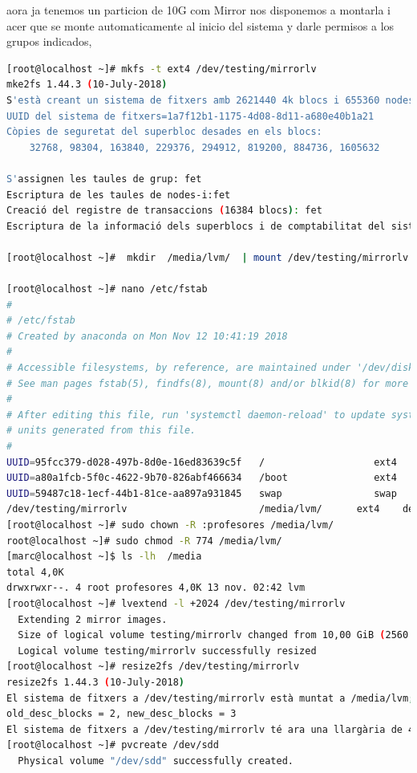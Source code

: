 \documentclass[preprint,11pt]{elsarticle}
\begin{document}
aora ja tenemos un particion de 10G com Mirror nos disponemos a montarla i acer que se monte automaticamente al inicio del sistema y darle permisos a los grupos indicados, 

\clearpage
\begin{lstlisting}[basicstyle=\tiny, language=bash]
[root@localhost ~]# mkfs -t ext4 /dev/testing/mirrorlv 
mke2fs 1.44.3 (10-July-2018)
S'està creant un sistema de fitxers amb 2621440 4k blocs i 655360 nodes-i
UUID del sistema de fitxers=1a7f12b1-1175-4d08-8d11-a680e40b1a21
Còpies de seguretat del superbloc desades en els blocs: 
	32768, 98304, 163840, 229376, 294912, 819200, 884736, 1605632

S'assignen les taules de grup: fet                            
Escriptura de les taules de nodes-i:fet                            
Creació del registre de transaccions (16384 blocs): fet
Escriptura de la informació dels superblocs i de comptabilitat del sistema de fitxers:fet  

[root@localhost ~]#  mkdir  /media/lvm/  | mount /dev/testing/mirrorlv  /media/lvm/ 

[root@localhost ~]# nano /etc/fstab 
#
# /etc/fstab
# Created by anaconda on Mon Nov 12 10:41:19 2018
#
# Accessible filesystems, by reference, are maintained under '/dev/disk/'.
# See man pages fstab(5), findfs(8), mount(8) and/or blkid(8) for more info.
#
# After editing this file, run 'systemctl daemon-reload' to update systemd
# units generated from this file.
#
UUID=95fcc379-d028-497b-8d0e-16ed83639c5f   /                   ext4    defaults        1 1
UUID=a80a1fcb-5f0c-4622-9b70-826abf466634   /boot               ext4    defaults        1 2
UUID=59487c18-1ecf-44b1-81ce-aa897a931845   swap                swap    defaults        0 0
/dev/testing/mirrorlv                       /media/lvm/      ext4    defaults        0 1
[root@localhost ~]# sudo chown -R :profesores /media/lvm/
root@localhost ~]# sudo chmod -R 774 /media/lvm/
[marc@localhost ~]$ ls -lh  /media
total 4,0K
drwxrwxr--. 4 root profesores 4,0K 13 nov. 02:42 lvm
[root@localhost ~]# lvextend -l +2024 /dev/testing/mirrorlv 
  Extending 2 mirror images.
  Size of logical volume testing/mirrorlv changed from 10,00 GiB (2560 extents) to <17,91 GiB (4584 extents).
  Logical volume testing/mirrorlv successfully resized
[root@localhost ~]# resize2fs /dev/testing/mirrorlv 
resize2fs 1.44.3 (10-July-2018)
El sistema de fitxers a /dev/testing/mirrorlv està muntat a /media/lvm; cal un canvi de mida en línia
old_desc_blocks = 2, new_desc_blocks = 3
El sistema de fitxers a /dev/testing/mirrorlv té ara una llargària de 4694016 (4k) blocs.
[root@localhost ~]# pvcreate /dev/sdd 
  Physical volume "/dev/sdd" successfully created.


\end{lstlisting}
\end{document}
